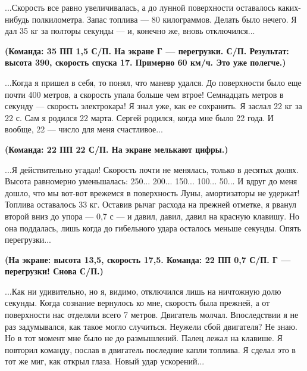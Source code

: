 \documentclass[11pt,a4paper,oneside]{article}
\begin{document}
...Скорость все равно увеличивалась, а до лунной поверхности оставалось каких-нибудь полкилометра. Запас топлива — 80 килограммов. Делать было нечего. Я дал 35 кг за полторы секунды — и, конечно же, вновь отключился...

\textbf{
(Команда: 35 ПП 1,5 С/П. На экране Г — перегрузки. С/П. Результат: высота 390, скорость спуска 17. Примерно 60 км/ч. Это уже полегче.)}

...Когда я пришел в себя, то понял, что маневр удался. До поверхности было еще почти 400 метров, а скорость упала больше чем втрое! Семнадцать метров в секунду — скорость электрокара! Я знал уже, как ее сохранить. Я заслал 22 кг за 22 с. Сам я родился 22 марта. Сергей родился, когда мне было 22 года. И вообще, 22 — число для меня счастливое...

\textbf{
(Команда: 22 ПП 22 С/П. На экране мелькают цифры.)}

...Я действительно угадал! Скорость почти не менялась, только в десятых долях. Высота равномерно уменьшалась: 250... 200... 150... 100... 50... И вдруг до меня дошло, что мы вот-вот врежемся в поверхность Луны, амортизаторы не удержат! Топлива оставалось 33 кг. Оставив рычаг расхода на прежней отметке, я рванул второй вниз до упора — 0,7 с — и давил, давил, давил на красную клавишу. Но она поддалась, лишь когда до гибельного удара осталось меньше секунды. Опять перегрузки...

\textbf{
(На экране: высота 13,5, скорость 17,5. Команда: 22 ПП 0,7 С/П. Г — перегрузки! Снова С/П.)}

...Как ни удивительно, но я, видимо, отключился лишь на ничтожную долю секунды. Когда сознание вернулось ко мне, скорость была прежней, а от поверхности нас отделяли всего 7 метров. Двигатель молчал. Впоследствии я не раз задумывался, как такое могло случиться. Неужели сбой двигателя? Не знаю. Но в тот момент мне было не до размышлений. Палец лежал на клавише. Я повторил команду, послав в двигатель последние капли топлива. Я сделал это в тот же миг, как открыл глаза. Новый удар ускорений...
\end{document}
